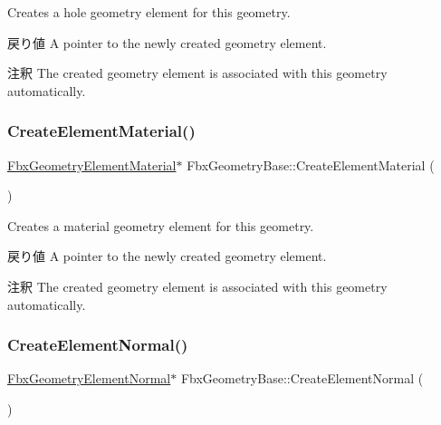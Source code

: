 Creates a hole geometry element for this geometry. \begin{DoxyReturn}{戻り値}
A pointer to the newly created geometry element. 
\end{DoxyReturn}
\begin{DoxyRemark}{注釈}
The created geometry element is associated with this geometry automatically. 
\end{DoxyRemark}
\mbox{\label{class_fbx_geometry_base_a1c93bffeaa9af18fd7ab9c2eb68ca4ec}} 
\subsubsection{\texorpdfstring{Create\+Element\+Material()}{CreateElementMaterial()}}
{\footnotesize\ttfamily \hyperlink{fbxlayer_8h_a1a779f3f614dbf0024c07f4a1d8332f4}{Fbx\+Geometry\+Element\+Material}$\ast$ Fbx\+Geometry\+Base\+::\+Create\+Element\+Material (\begin{DoxyParamCaption}{ }\end{DoxyParamCaption})}

Creates a material geometry element for this geometry. \begin{DoxyReturn}{戻り値}
A pointer to the newly created geometry element. 
\end{DoxyReturn}
\begin{DoxyRemark}{注釈}
The created geometry element is associated with this geometry automatically. 
\end{DoxyRemark}
\mbox{\label{class_fbx_geometry_base_a13810d0c6ac68ab14be3f1316b977f7d}} 
\subsubsection{\texorpdfstring{Create\+Element\+Normal()}{CreateElementNormal()}}
{\footnotesize\ttfamily \hyperlink{fbxlayer_8h_a54a5aaec6f1979871fe9d93dd2d246c9}{Fbx\+Geometry\+Element\+Normal}$\ast$ Fbx\+Geometry\+Base\+::\+Create\+Element\+Normal (\begin{DoxyParamCaption}{ }\end{DoxyParamCaption})}

